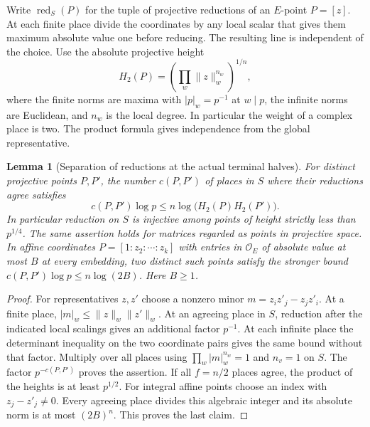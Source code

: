 \documentclass[a4paper,11pt]{article}
\newtheorem{lemma}[proposition]{Lemma}
\theoremstyle{definition}
\theoremstyle{remark}
\numberwithin{equation}{section}
\begin{document}
Write \(\operatorname{red}_S(P)\) for the tuple of projective
reductions of an \(E\)-point \(P=[z]\). At each finite place divide
the coordinates by any local scalar that gives them maximum absolute
value one before reducing. The resulting line is independent of the
choice. Use the absolute projective height
\[
 H_2(P)=\left(\prod_w \|z\|_w^{n_w}\right)^{1/n},
\]
where the finite norms are maxima with \(|p|_w=p^{-1}\) at \(w\mid p\),
the infinite norms are Euclidean, and \(n_w\) is the local degree.
In particular the weight of a complex place is two. The product
formula gives independence from the global representative.

\begin{lemma}[Separation of reductions at the actual terminal halves]
\leavevmode\label{lem:heightsep522}
For distinct projective points \(P,P'\), the number \(c(P,P')\) of
places in \(S\) where their reductions agree satisfies
\[
 c(P,P')\log p\le n\log\big(H_2(P)H_2(P')\big).
\]
In particular reduction on \(S\) is injective among points of height
strictly less than \(p^{1/4}\). The same assertion holds for matrices
regarded as points in projective space. In affine coordinates
\(P=[1:z_2:\cdots:z_k]\) with entries in \(\mathcal O_E\) of
absolute value at most \(B\) at every embedding, two distinct such
points satisfy the stronger bound \(c(P,P')\log p\le n\log(2B)\).
Here \(B\ge1\).
\end{lemma}
\begin{proof}
For representatives \(z,z'\) choose a nonzero minor
\(m=z_i z'_j-z_j z'_i\). At a finite place,
\(|m|_w\le\|z\|_w\|z'\|_w\). At an agreeing place in \(S\), reduction
after the indicated local scalings gives an additional factor
\(p^{-1}\). At each infinite place the determinant inequality on
the two coordinate pairs gives the same bound without that factor.
Multiply over all places using \(\prod_w|m|_w^{n_w}=1\) and \(n_v=1\)
on \(S\). The factor \(p^{-c(P,P')}\) proves the assertion. If all
\(f=n/2\) places agree, the product of the heights is at least
\(p^{1/2}\). For integral affine points choose an index with
\(z_j-z'_j\ne0\). Every agreeing place divides this algebraic integer
and its absolute norm is at most \((2B)^n\). This proves the last
claim.
\end{proof}
\end{document}
